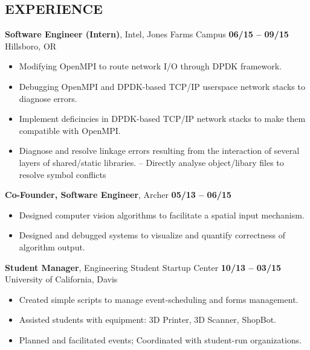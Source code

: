 \documentclass[line, letterpaper, 10pt]{res}
\begin{document}
\begin{resume}
\section{EXPERIENCE}

    {\bf Software Engineer (Intern)}, Intel, Jones Farms Campus \hfill {\bf 06/15 -- 09/15} \\
    Hillsboro, OR
    \begin{itemize} \itemsep -2pt
        \item Modifying OpenMPI to route network I/O through DPDK framework.
        \item Debugging OpenMPI and DPDK-based TCP/IP userspace network stacks to diagnose errors.
        \item Implement deficincies in DPDK-based TCP/IP network stacks to make them compatible with OpenMPI.
        \item Diagnose and resolve linkage errors resulting from the interaction of several layers of shared/static libraries.
            \subitem -- Directly analyse object/libary files to resolve symbol conflicts
    \end{itemize}

    {\bf Co-Founder, Software Engineer}, Archer \hfill {\bf 05/13 -- 06/15}
    \begin{itemize} \itemsep -2pt %
        \item Designed computer vision algorithms to facilitate a spatial input mechanism.
        \item Designed and debugged systems to visualize and quantify correctness of algorithm output.
    \end{itemize}

    {\bf Student Manager}, Engineering Student Startup Center \hfill {\bf 10/13 -- 03/15} \\
    University of California, Davis
    \begin{itemize} \itemsep -2pt %
        \item Created simple scripts to manage event-scheduling and forms management.
        \item Assisted students with equipment: 3D Printer, 3D Scanner, ShopBot.
        \item Planned and facilitated events; Coordinated with student-run organizations.
    \end{itemize}


\end{resume}
\end{document}

